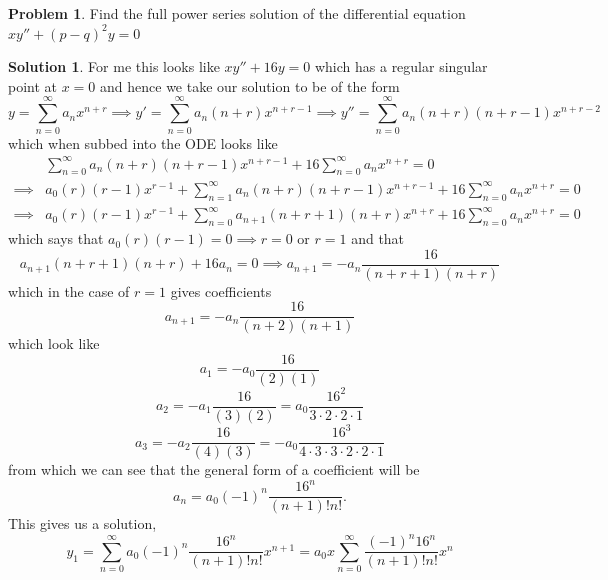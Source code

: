\documentclass[10pt]{article}
\theoremstyle{definition}
\newtheorem{problem}{Problem}
\newtheorem{soln}{Solution}
\begin{document}
\begin{problem}
Find the full power series solution of the differential equation $xy'' + (p - q)^2y = 0$
\end{problem}
\begin{soln}
  For me this looks like $xy'' + 16y = 0$ which has a regular singular point at $x=0$ and hence we take our solution to be
  of the form
  $$y=\sum_{n=0}^{\infty}a_nx^{n+r}\implies y'=\sum_{n=0}^{\infty}a_n(n+r)x^{n+r-1}\implies y''=\sum_{n=0}^{\infty}a_n(n+r)(n+r-1)x^{n+r-2}$$
  which when subbed into the ODE looks like
  \begin{align*}
             & \sum_{n=0}^{\infty}a_n(n+r)(n+r-1)x^{n+r-1} + 16\sum_{n=0}^{\infty}a_nx^{n+r} = 0                      \\
    \implies & a_0(r)(r-1)x^{r-1}+\sum_{n=1}^{\infty}a_n(n+r)(n+r-1)x^{n+r-1} + 16\sum_{n=0}^{\infty}a_nx^{n+r} = 0   \\
    \implies & a_0(r)(r-1)x^{r-1}+\sum_{n=0}^{\infty}a_{n+1}(n+r+1)(n+r)x^{n+r} + 16\sum_{n=0}^{\infty}a_nx^{n+r} = 0
  \end{align*}
  \newpage
  which says that $a_0(r)(r-1)=0\implies r=0\text{ or } r=1$ and that
  $$a_{n+1}(n+r+1)(n+r) + 16a_n=0\implies a_{n+1}  =-a_n\frac{16}{(n+r+1)(n+r)}$$
  which in the case of $r=1$ gives coefficients
  $$a_{n+1} =-a_n\frac{16}{(n+2)(n+1)}$$
  which look like
  $$a_{1} =-a_0\frac{16}{(2)(1)}$$
  $$a_{2} =-a_1\frac{16}{(3)(2)}=a_0\frac{16^2}{3\cdot2\cdot 2\cdot 1}$$
  $$a_{3} =-a_2\frac{16}{(4)(3)}=-a_0\frac{16^3}{4\cdot 3\cdot 3\cdot2\cdot 2\cdot 1}$$
  from which we can see that the general form of a coefficient will be
  $$a_n=a_0(-1)^n\frac{16^n}{(n+1)!n!}.$$
  This gives us a solution,
  $$y_1=\sum_{n=0}^{\infty}a_0(-1)^n\frac{16^n}{(n+1)!n!}x^{n+1}=a_0x\sum_{n=0}^{\infty}\frac{(-1)^n16^n}{(n+1)!n!}x^{n}$$




\end{soln}
\end{document}
